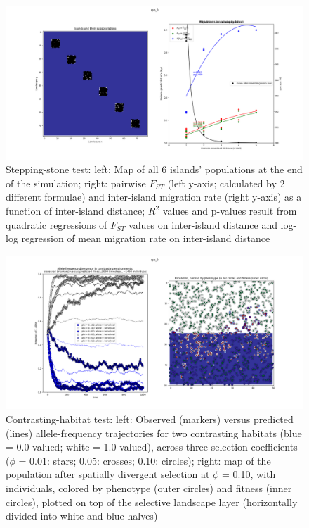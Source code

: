 ﻿\documentclass{article}
\begin{document}
\begin{figure}[h!]
\includegraphics[width=175mm]{./img/validation/stepping_stone/pop_plot_and_Fst_and_mig_rate_plot.png}
        \caption{Stepping-stone test: left: Map of all 6 islands' populations at the end of the simulation; right: pairwise $F_{ST}$ (left y-axis; calculated by 2 different formulae) and inter-island migration rate (right y-axis) as a function of inter-island distance; $R^{2}$ values and p-values result from quadratic regressions of $F_{ST}$ values on inter-island distance and log-log regression of mean migration rate on inter-island distance}
        \label{fig:stepstone_pop_and_Fst_mig_expecs}
\end{figure}


\begin{figure}[h!]
\includegraphics[width=175mm]{./img/validation/divergence/divergence_test_ca1400_individuals_1000_timesteps.png}
        \caption{Contrasting-habitat test: left: Observed (markers) versus predicted (lines) allele-frequency trajectories for two contrasting habitats (blue = 0.0-valued; white = 1.0-valued), across three selection coefficients ($\phi$ = 0.01: stars; 0.05: crosses; 0.10: circles); right: map of the population after spatially divergent selection at $\phi$ = 0.10, with individuals, colored by phenotype (outer circles) and fitness (inner circles), plotted on top of the selective landscape layer (horizontally divided into white and blue halves)}
        \label{fig:div}
\end{figure}
\end{document}
